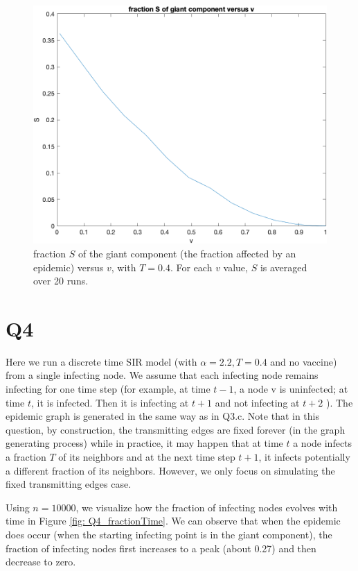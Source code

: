 \documentclass{article}
\begin{document}
\begin{figure}[htp]
	\centering
	\includegraphics[width=.8\linewidth]{figs/Q3_d.png}
	\caption{fraction $ S $ of the giant component (the fraction affected by an epidemic) versus $ v $, with $ T = 0.4 $. For each $ v $ value, $ S $ is averaged over 20 runs.}
	\label{fig: Q3_d}
\end{figure}

\section*{Q4}
Here we run a discrete time SIR model (with $ \alpha=2.2, T = 0.4 $ and no vaccine) from a single infecting node. We assume that each infecting node remains infecting for one time step (for example, at time $ t-1 $, a node v is uninfected; at time $ t $, it is infected. Then it is infecting at $ t+1 $ and not infecting at $ t+2 $ ). The epidemic graph is generated in the same way as in Q3.c. Note that in this question, by construction, the transmitting edges are fixed forever (in the graph generating process) while in practice, it may happen that at time $ t $ a node infects a fraction $ T $ of its neighbors and at the next time step $ t+1 $, it infects potentially a different fraction of its neighbors. However, we only focus on simulating
 the fixed transmitting edges case.
 
Using $ n = 10000$, we visualize how the fraction of infecting nodes evolves with time in Figure \ref{fig: Q4_fractionTime}. We can observe that when the epidemic does occur (when the starting infecting point is in the giant component), the fraction of infecting nodes first increases to a peak (about 0.27) and then decrease to zero.
 
\end{document}
